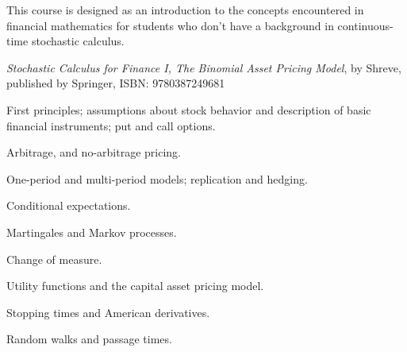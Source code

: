 \documentclass{osucourse}
\begin{document}
\CatalogDescription
\PrerequisitesAndExclusions

\begin{Purpose}
This course is designed as an introduction to the concepts encountered in financial mathematics for students who don’t have a background in continuous-time stochastic calculus.
\end{Purpose}

\begin{Text}
\emph{Stochastic Calculus for Finance I, The Binomial Asset Pricing Model}, by Shreve, published by Springer, ISBN: 9780387249681
\end{Text}

\begin{TopicsList}
\item First principles; assumptions about stock behavior and description of basic financial instruments; put and call options.
\item Arbitrage, and no-arbitrage pricing.
\item One-period and multi-period models; replication and hedging.
\item Conditional expectations.
\item Martingales and Markov processes.
\item Change of measure.
\item Utility functions and the capital asset pricing model.
\item Stopping times and American derivatives.
\item Random walks and passage times.
\end{TopicsList}
\end{document}
